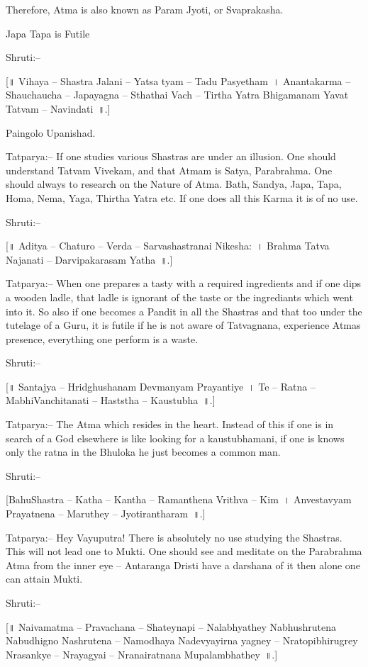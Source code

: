 Therefore, Atma is also known as Param Jyoti, or Svaprakasha.

Japa Tapa is Futile

Shruti:–

[॥ Vihaya – Shastra Jalani – Yatsa tyam – Tadu Pasyetham~। Anantakarma – Shauchaucha – Japayagna – Sthathai Vach – Tirtha Yatra Bhigamanam Yavat Tatvam – Navindati~॥.]

Paingolo Upanishad.

Tatparya:– If one studies various Shastras are under an illusion. One should understand Tatvam Vivekam, and that Atmam is Satya, Parabrahma. One should always to research on the Nature of Atma. Bath, Sandya, Japa, Tapa, Homa, Nema, Yaga, Thirtha Yatra etc. If one does all this Karma it is of no use.

Shruti:–

[॥ Aditya – Chaturo – Verda – Sarvashastranai Nikesha:~। Brahma Tatva Najanati – Darvipakarasam Yatha~॥.]

Tatparya:– When one prepares a tasty with a required ingredients and if one dips a wooden ladle, that ladle is ignorant of the taste or the ingrediants which went into it. So also if one becomes a Pandit in all the Shastras and that too under the tutelage of a Guru, it is futile if he is not aware of Tatvagnana, experience Atmas presence, everything one perform is a waste.

Shruti:–

[॥ Santajya – Hridghushanam Devmanyam Prayantiye~। Te – Ratna – MabhiVanchitanati – Haststha – Kaustubha~॥.]

Tatparya:– The Atma which resides in the heart. Instead of this if one is in search of a God elsewhere is like looking for a kaustubhamani, if one is knows only the ratna in the Bhuloka he just becomes a common man.

Shruti:–

[BahuShastra – Katha – Kantha – Ramanthena Vrithva – Kim~। Anvestavyam Prayatnena – Maruthey – Jyotirantharam~॥.]

Tatparya:– Hey Vayuputra! There is absolutely no use studying the Shastras. This will not lead one to Mukti. One should see and meditate on the Parabrahma Atma from the inner eye – Antaranga Dristi have a darshana of it then alone one can attain Mukti.

Shruti:–

[॥ Naivamatma – Pravachana – Shateynapi – Nalabhyathey Nabhushrutena Nabudhigno Nashrutena – Namodhaya Nadevyayirna yagney – Nratopibhirugrey Nrasankye – Nrayagyai – Nranairatnana Mupalambhathey~॥.]

